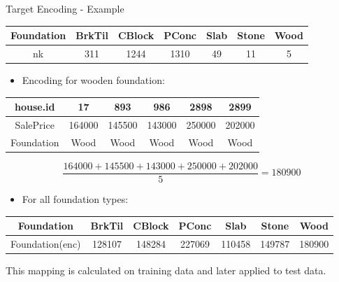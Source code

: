\begin{vbframe}{Target Encoding - Example}
  \vspace{+.4cm}
  
  
  \footnotesize
  \begin{center}
    \begin{tabular}{c|c|c|c|c|c|c}
      \hline
      Foundation & BrkTil & CBlock & PConc & Slab & Stone & Wood \\
      \hline
      nk         & 311    & 1244   & 1310  & 49   & 11    & 5    \\
      \hline
    \end{tabular}
  \end{center}
  
  
  \normalsize
  \begin{itemize}
    \item Encoding for wooden foundation:
  \end{itemize}
  \vspace{+.4cm}
  
  \footnotesize
  \begin{center}
    \begin{tabular}{c|c|c|c|c|c}
      \hline
      house.id   & 17     & 893    & 986    & 2898   & 2899   \\
      \hline
      SalePrice  & 164000 & 145500 & 143000 & 250000 & 202000 \\
      \hline
      Foundation & Wood   & Wood   & Wood   & Wood   & Wood   \\
      \hline
    \end{tabular}
  \end{center}
  
  \vspace{+.4cm}
  $$
    \frac{164000 + 145500 + 143000 + 250000 + 202000}{5} = 180900
  $$
  \framebreak
  
  
  \normalsize
  \begin{itemize}
    \item For all foundation types:
  \end{itemize}
  \vspace{+.4cm}
  
  \footnotesize
  \begin{tabular}{c|c|c|c|c|c|c}
    \hline
    Foundation      & BrkTil & CBlock & PConc  & Slab   & Stone  & Wood   \\
    \hline
    Foundation(enc) & 128107 & 148284 & 227069 & 110458 & 149787 & 180900 \\
    \hline
  \end{tabular}
  
  
  \vspace{+.4cm}
  \normalsize
  This mapping is calculated on training data and later applied to test data.
\end{vbframe}

